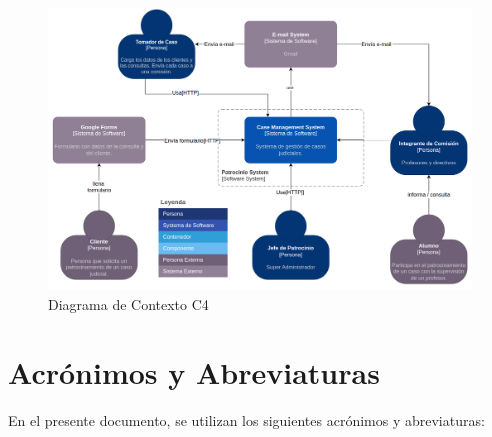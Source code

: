 \begin{figure}[H]
    \centering
    \includegraphics[width=1.1\linewidth]{fig/c4-1.png}
    \caption{Diagrama de Contexto C4}
    \label{fig:c4-01}
\end{figure}

\section{Acrónimos y Abreviaturas}
\label{sec:acronimos}

En el presente documento, se utilizan los siguientes acrónimos y abreviaturas:

